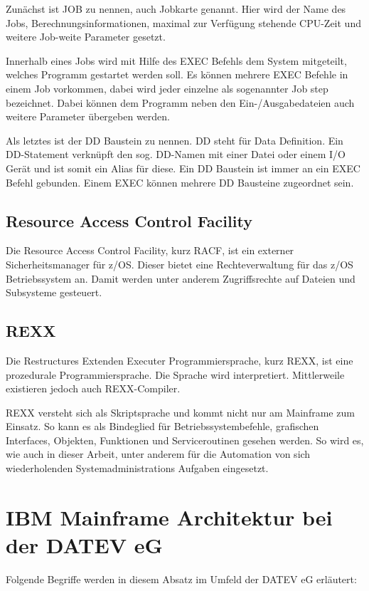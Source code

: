 Zunächst ist \glqq JOB\grqq{} zu nennen, auch Jobkarte genannt.
Hier wird der Name des Jobs, Berechnungsinformationen, maximal zur Verfügung stehende CPU-Zeit und weitere Job-weite Parameter gesetzt.

Innerhalb eines Jobs wird mit Hilfe des \glqq EXEC\grqq{} Befehls dem System mitgeteilt, welches Programm gestartet werden soll.
Es können mehrere \glqq EXEC\grqq{}  Befehle in einem Job vorkommen, dabei wird jeder einzelne als sogenannter \glqq Job step\grqq{} bezeichnet.
Dabei können dem Programm neben den Ein-/Ausgabedateien auch weitere Parameter übergeben werden.

Als letztes ist der \glqq DD\grqq{} Baustein zu nennen.
\glqq DD\grqq{} steht für Data Definition.
Ein DD-Statement verknüpft den sog. DD-Namen mit einer Datei oder einem I/O Gerät und ist somit ein Alias für diese.
Ein \glqq DD\grqq{} Baustein ist immer an ein \glqq EXEC\grqq{} Befehl gebunden.
Einem \glqq EXEC\grqq{} können mehrere \glqq DD\grqq{} Bausteine zugeordnet sein. 
\cite{Ebbers.2011}

\subsection{Resource Access Control Facility}
Die Resource Access Control Facility, kurz RACF, ist ein externer Sicherheitsmanager für z/OS.
Dieser bietet eine Rechteverwaltung für das z/OS Betriebssystem an.
Damit werden unter anderem Zugriffsrechte auf Dateien und Subsysteme gesteuert.
\cite{InternationalBusinessMachinesCorporation.2008}

\subsection{REXX}
Die Restructures Extenden Executer Programmiersprache, kurz REXX, ist eine prozedurale Programmiersprache.
Die Sprache wird interpretiert.
Mittlerweile existieren jedoch auch REXX-Compiler.
\cite{Parziale.2007}

REXX versteht sich als Skriptsprache und kommt nicht nur am Mainframe zum Einsatz.
So kann es als Bindeglied für Betriebssystembefehle, grafischen Interfaces, Objekten, Funktionen und Serviceroutinen gesehen werden.
So wird es, wie auch in dieser Arbeit, unter anderem für die Automation von sich wiederholenden Systemadministrations Aufgaben eingesetzt.
\cite{Fosdick.2005}

\section{IBM Mainframe Architektur bei der DATEV eG}
Folgende Begriffe werden in diesem Absatz im Umfeld der DATEV eG erläutert:

